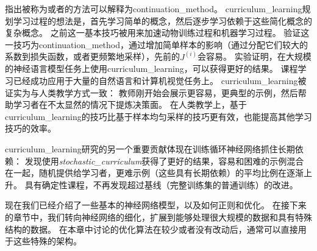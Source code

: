 \cite{Bengio+al-2009}指出被称为或者的方法可以解释为\gls{continuation_method}。
\gls{curriculum_learning}规划学习过程的想法是，首先学习简单的概念，然后逐步学习依赖于这些简化概念的复杂概念。
之前这一基本技巧被用来加速动物训练过程\citep{Skinner1958,Peterson2004,Krueger+Dayan-2009}和机器学习过程\citep{solomonoff1989system,Elman93,Sanger-1994}。
\cite{Bengio+al-2009}验证这一技巧为\gls{continuation_method}，通过增加简单样本的影响（通过分配它们较大的系数到损失函数，或者更频繁地采样），先前的$J^{(i)}$会容易。
实验证明，在大规模的神经语言模型任务上使用\gls{curriculum_learning}，可以获得更好的结果。
课程学习已经成功应用于大量的自然语言\citep{Spitkovsky-et-al-HLT2010,collobert2011natural,Mikolov-ASRU-2011,Tu+Honavar-IJCAI2011}和计算机视觉\citep{Kumar+al-2010,Lee+Grauman-CVPR2011,Supancic+Ramanan-CVPR2013}任务上。
\gls{curriculum_learning}被证实为与人类教学方式一致\citep{Khan+Zhu+Mutlu-2011}：
教师刚开始会展示更容易，更典型的示例，然后帮助学习者在不太显然的情况下提炼决策面。
在人类教学上，基于\gls{curriculum_learning}的技巧比基于样本均匀采样的技巧更有效，也能提高其他学习技巧的效率\citep{Basu+Christensen-AAAI2013}。


\gls{curriculum_learning}研究的另一个重要贡献体现在训练循环神经网络抓住长期依赖：
\cite{Zaremba+Sutskever-arxiv2014}发现使用\emph{\gls{stochastic_curriculum}}获得了更好的结果，容易和困难的示例混合在一起，随机提供给学习者，更难示例（这些具有长期依赖）的平均比例在逐渐上升。
具有确定性课程，不再发现超过基线（完整训练集的普通训练）的改进。

现在我们已经介绍了一些基本的神经网络模型，以及如何正则和优化。
在接下来的章节中，我们转向神经网络的细化，扩展到能够处理很大规模的数据和具有特殊结构的数据。
在本章中讨论的优化算法在较少或者没有改动后，通常可以直接用于这些特殊的架构。




















